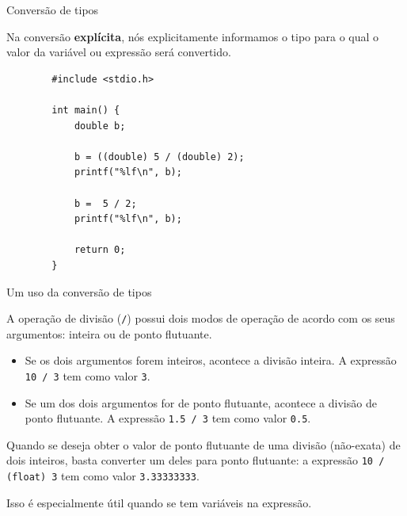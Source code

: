 \documentclass[handout]{beamer}
\newcommand{\cod}[1]{\texttt{#1}}
\begin{document}
\begin{frame}[fragile]{Conversão de tipos}

    Na conversão \textbf{explícita}, nós explicitamente informamos o tipo para o qual o valor da variável ou expressão será convertido.

    \begin{verbatim}
        #include <stdio.h>

        int main() {
            double b;

            b = ((double) 5 / (double) 2);
            printf("%lf\n", b);

            b =  5 / 2;
            printf("%lf\n", b);

            return 0;
        }
    \end{verbatim}
\end{frame}

\begin{frame}[fragile]{Um uso da conversão de tipos}

    A operação de divisão (\cod{/}) possui dois modos de operação de acordo com os seus argumentos: inteira ou de ponto flutuante.
    \begin{itemize}
        \item Se os dois argumentos forem inteiros, acontece a divisão inteira.
        A expressão \cod{10 / 3} tem como valor \cod{3}.
        \item Se \alert{um} dos dois argumentos for de ponto flutuante, acontece a divisão de ponto flutuante.
        A expressão \cod{1.5 / 3} tem como valor \cod{0.5}.
    \end{itemize}

    \pause
    Quando se deseja obter o valor de ponto flutuante de uma divisão (não-exata) de dois inteiros, basta converter um deles para ponto flutuante: a expressão \cod{10 / (float) 3} tem como valor \cod{3.33333333}.

    \pause
    Isso é especialmente útil quando se tem variáveis na expressão.
\end{frame}

\end{document}
